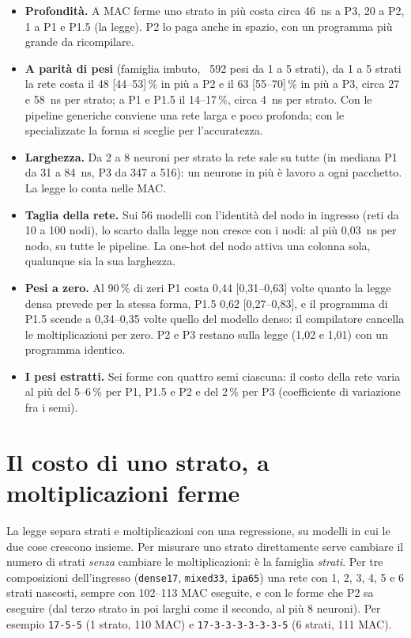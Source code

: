 \documentclass[11pt,a4paper,oneside]{report}
\begin{document}
\begin{itemize}
  \item \textbf{Profondità.} A MAC ferme uno strato in più costa circa 46~ns a P3, 20
        a P2, 1 a P1 e P1.5 (la legge). P2 lo paga anche in spazio, con un
        programma più grande da ricompilare.
  \item \textbf{A parità di pesi} (famiglia imbuto, ~592 pesi da 1 a 5 strati), da
        1 a 5 strati la rete costa il 48 [44--53]\,\% in più a P2 e il 63
        [55--70]\,\% in più a P3, circa 27 e 58~ns per strato; a P1 e P1.5 il
        14--17\,\%, circa 4~ns per strato. Con le pipeline generiche conviene una
        rete larga e poco profonda; con le specializzate la forma si sceglie per
        l'accuratezza.
  \item \textbf{Larghezza.} Da 2 a 8 neuroni per strato la rete sale su tutte (in
        mediana P1 da 31 a 84~ns, P3 da 347 a 516): un neurone in più è lavoro a
        ogni pacchetto. La legge lo conta nelle MAC.
  \item \textbf{Taglia della rete.} Sui 56 modelli con l'identità del nodo in
        ingresso (reti da 10 a 100 nodi), lo scarto dalla legge non cresce con i
        nodi: al più 0,03~ns per nodo, su tutte le pipeline. La one-hot del nodo
        attiva una colonna sola, qualunque sia la sua larghezza.
  \item \textbf{Pesi a zero.} Al 90\,\% di zeri P1 costa 0,44 [0,31--0,63] volte quanto
        la legge densa prevede per la stessa forma, P1.5 0,62 [0,27--0,83], e il
        programma di P1.5 scende a 0,34--0,35 volte quello del modello denso: il
        compilatore cancella le moltiplicazioni per zero. P2 e P3 restano sulla
        legge (1,02 e 1,01) con un programma identico.
  \item \textbf{I pesi estratti.} Sei forme con quattro semi ciascuna: il costo della
        rete varia al più del 5--6\,\% per P1, P1.5 e P2 e del 2\,\% per P3
        (coefficiente di variazione fra i semi).
\end{itemize}

\section{Il costo di uno strato, a moltiplicazioni ferme}
\label{sec:pop-strato}

La legge separa strati e moltiplicazioni con una regressione, su modelli in cui
le due cose crescono insieme. Per misurare uno strato direttamente serve
cambiare il numero di strati \emph{senza} cambiare le moltiplicazioni: è la
famiglia \emph{strati}. Per tre composizioni dell'ingresso (\texttt{dense17},
\texttt{mixed33}, \texttt{ipa65}) una rete con 1, 2, 3, 4, 5 e 6 strati
nascosti, sempre con 102--113 MAC eseguite, e con le forme che P2 sa eseguire
(dal terzo strato in poi larghi come il secondo, al più 8 neuroni). Per esempio
\texttt{17-5-5} (1 strato, 110 MAC) e \texttt{17-3-3-3-3-3-3-5} (6 strati, 111
MAC).
\end{document}
